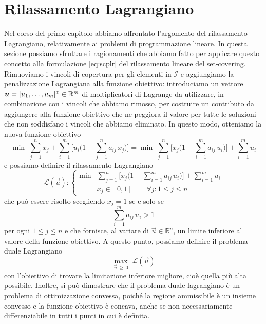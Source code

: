 \section{Rilassamento Lagrangiano}
Nel corso del primo capitolo abbiamo affrontato l'argomento del rilassamento Lagrangiano, relativamente ai problemi di
programmazione lineare. In questa sezione possiamo sfruttare i ragionamenti che abbiamo fatto per applicare questo
concetto alla formulazione \eqref{eq:scplr} del rilassamento lineare del set-covering. Rimuoviamo i vincoli di copertura
per gli elementi in \( \mathcal{I} \) e aggiungiamo la penalizzazione Lagrangiana alla funzione obiettivo: introduciamo
un vettore \( \bm{u} = [u_1, \ldots, u_m]^{\scriptscriptstyle\mathrm{T}} \in \mathbb{R}^m \) di moltiplicatori di Lagrange da utilizzare, in
combinazione con i vincoli che abbiamo rimosso, per costruire un contributo da aggiungere alla funzione obiettivo che ne
peggiora il valore per tutte le soluzioni che non soddisfano i vincoli che abbiamo eliminato. In questo modo, otteniamo
la nuova funzione obiettivo
\begin{equation}
    \min \; \sum_{j = 1}^n x_j + \sum_{i = 1}^m \Big[u_i \Big(1 - \sum_{j = 1}^n a_{ij}\, x_j\Big)\Big] =
    \min \; \sum_{j = 1}^n \Big[x_j\Big(1 - \sum_{i = 1}^m a_{ij}\, u_i \Big)\Big] + \sum_{i = 1}^m u_i
\end{equation}
e possiamo definire il rilassamento Lagrangiano
\begin{equation}\label{eq:Lu}
    \mathcal{L}(\vec{u})\colon
    \left\{
    \begin{array}{ll}
        \min & \displaystyle\sum_{j=1}^n \Big[x_j \Big(1 - \sum_{i = 1}^m a_{ij}\, u_i\Big)\Big] + \sum_{i = 1}^m u_i
        \\[20pt]
             & x_j \in [0, 1] \qquad \forall j\colon 1 \leq j \leq n
    \end{array}\right.
\end{equation}
che può essere risolto scegliendo \( x_j = 1\) se e solo se
\begin{equation}
    \sum_{i=1}^m a_{ij}\, u_i > 1
\end{equation}
per ogni \( 1 \leq j \leq n \) e che fornisce, al variare di \( \vec{u} \in \mathbb{R}^n \), un limite inferiore al valore della funzione
obiettivo. A questo punto, possiamo definire il problema duale Lagrangiano
\begin{equation}
    \max_{\vec{u} \,\geq\, 0}\; \mathcal{L}(\vec{u})
\end{equation}
con l'obiettivo di trovare la limitazione inferiore migliore, cioè quella più alta possibile. Inoltre, si può dimostrare
che il problema duale lagrangiano è un problema di ottimizzazione convessa, poiché la regione ammissibile è un insieme
convesso e la funzione obiettivo è concava, anche se non necessariamente differenziabile in tutti i punti in cui è
definita.

